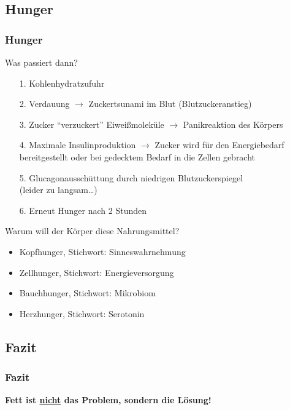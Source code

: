 \documentclass[xcolor=dvipsnames]{beamer}
\begin{document}
    \subsection{Hunger}
    \begin{frame}[allowframebreaks]
        \frametitle{Hunger}
        \begin{block}{Was passiert dann?}
            \begin{itemize}
                \setlength\itemsep{1em}
                \item[1.] Kohlenhydratzufuhr
                \item[2.] Verdauung $\rightarrow$ Zuckertsunami im Blut (Blutzuckeranstieg)
                \item[3.] Zucker "`verzuckert"' Eiweißmoleküle $\rightarrow$ Panikreaktion des Körpers
                \item[4.] Maximale Insulinproduktion $\rightarrow$ Zucker wird für den Energiebedarf bereitgestellt oder
                bei gedecktem Bedarf in die Zellen gebracht
                \item[5.] Glucagonausschüttung durch niedrigen Blutzuckerspiegel\\(leider zu langsam\ldots)
                \item[6.] Erneut Hunger nach 2 Stunden
            \end{itemize}
        \end{block}

        \framebreak

        \begin{block}{Warum will der Körper diese Nahrungsmittel?}
            \begin{itemize}
                \setlength\itemsep{1em}
                \item Kopfhunger,   Stichwort: Sinneswahrnehmung
                \item Zellhunger,   Stichwort: Energieversorgung
                \item Bauchhunger,  Stichwort: Mikrobiom
                \item Herzhunger,   Stichwort: Serotonin
            \end{itemize}
        \end{block}
    \end{frame}

    \subsection{Fazit}
    \begin{frame}
        \frametitle{Fazit}
        \begin{center}
            \textbf{Fett ist \underline{nicht} das Problem, sondern die Lösung!}
        \end{center}
    \end{frame}
\end{document}
